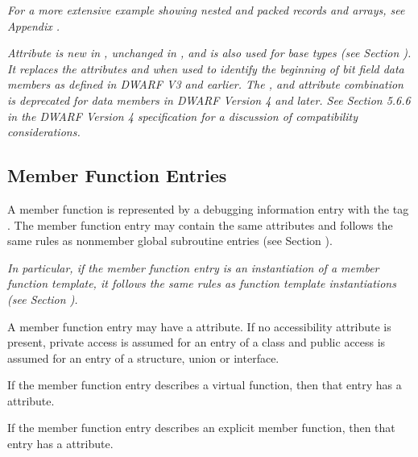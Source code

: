 \textit{For a more extensive example showing nested and packed records
and arrays, see 
Appendix .}

\textit{Attribute \DWATdatabitoffset{} 
is new in 
, unchanged in ,
and is also used for base types 
(see Section 
). 
It replaces the
attributes \DWATbitoffset{} and
\DWATbytesize{} when used to
identify the beginning of bit field data members as defined
in DWARF V3 and earlier. The \DWATbytesize, 
\DWATbitsize{} and 
\DWATbitoffset{}
attribute combination is deprecated for data members in DWARF
Version 4 and later. See Section 5.6.6 in the DWARF Version 4
specification for a discussion of compatibility considerations.}

\subsection{Member Function Entries}
\label{chap:memberfunctionentries}

A member function is represented by a 
debugging information entry 
with the 
tag \DWTAGsubprogram.
The member function entry
may contain the same attributes and follows the same rules
as non\dash member global subroutine entries 
(see Section ).

\textit{In particular, if the member function entry is an
instantiation of a member function template, it follows the 
same rules as function template instantiations (see Section 
).
}

A 
member function entry may have a 
\DWATaccessibility{}
attribute. If no accessibility attribute is present, private
access is assumed for an entry of a class and public access
is assumed for an entry of a structure, union or interface.

If 
\hypertarget{chap:DWATvirtualityvirtualityoffunction}{}
the member function entry describes a virtual function,
then that entry has a 
\DWATvirtuality{} attribute.

If 
\hypertarget{chap:DWATexplicitexplicitpropertyofmemberfunction}{}
the member function entry describes an explicit member
function, then that entry has 
a 
\DWATexplicit{} attribute.

